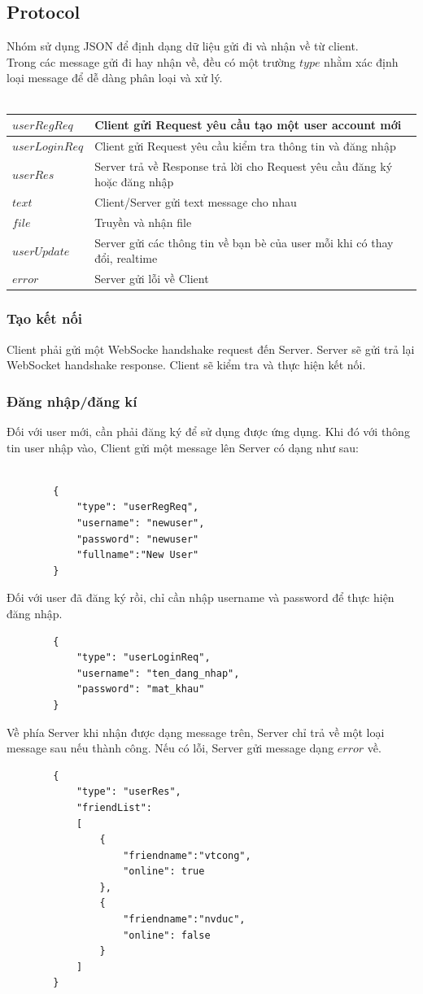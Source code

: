 \documentclass[10pt]{article}
\begin{document}
		\subsection{Protocol}
			Nhóm sử dụng JSON để định dạng dữ liệu gửi đi và nhận về từ client.\\
			Trong các message gửi đi hay nhận về, đều có một trường $type$ nhằm xác định loại message để dễ dàng phân loại và xử lý.\\\\

			\begin{tabular}{l|l}
			\hline 
			$userRegReq$ & Client gửi Request yêu cầu tạo một user account mới \\ 
			\hline 
			$userLoginReq$ & Client gửi Request yêu cầu kiểm tra thông tin và đăng nhập \\ 
			\hline 
			$userRes$ & Server trả về Response trả lời cho Request yêu cầu đăng ký hoặc đăng nhập \\ 
			\hline 
			$text$ & Client/Server gửi text message cho nhau \\ 
			\hline 
			$file$ & Truyền và nhận file \\ 
			\hline 
			$userUpdate$ & Server gửi các thông tin về bạn bè của user mỗi khi có thay đổi, realtime \\ 
			\hline 
			$error$ & Server gửi lỗi về Client \\ 
			\hline 
			\end{tabular} 
			\subsubsection{Tạo kết nối}
			Client phải gửi một WebSocke handshake request đến Server. Server sẽ gửi trả lại WebSocket handshake response. Client sẽ kiểm tra và thực hiện kết nối.
			\subsubsection{Đăng nhập/đăng kí}
				Đối với user mới, cần phải đăng ký để sử dụng được ứng dụng. Khi đó với thông tin user nhập vào, Client gửi một message lên Server có dạng như sau:\\\\
				\begin{lstlisting}
		{
			"type": "userRegReq",
			"username": "newuser",
			"password": "newuser"
			"fullname":"New User"
		}
		        	\end{lstlisting}
		        	Đối với user đã đăng ký rồi, chỉ cần nhập username và password để thực hiện đăng nhập.
				\begin{lstlisting}
		{
			"type": "userLoginReq",
			"username": "ten_dang_nhap",
			"password": "mat_khau"    
		}
	        		\end{lstlisting}
		        	Về phía Server khi nhận được dạng message trên, Server chỉ trả về một loại message sau nếu thành công. Nếu có lỗi, Server gửi message dạng $error$ về.
					\begin{lstlisting}
		{
			"type": "userRes",
			"friendList":
			[
				{
					"friendname":"vtcong", 
					"online": true
				},
				{
					"friendname":"nvduc",
					"online": false
				}
			]
		}
		        	\end{lstlisting}
\end{document}
